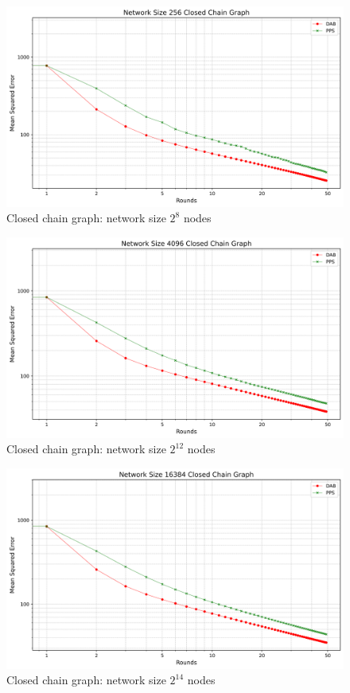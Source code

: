 \begin{figure}[H]
    \centering
    \includegraphics[scale=0.5]{figures/closedChainSimulations/DAB_vs_PPS_CCG_r50_n256.png}
    \caption{Closed chain graph: network size $2^{8}$ nodes}
    \label{fig:256ChainGraph}
\end{figure}

\begin{figure}[H]
    \centering
    \includegraphics[scale=0.5]{figures/closedChainSimulations/DAB_vs_PPS_CCG_r50_n4096.png}
    \caption{Closed chain graph: network size $2^{12}$ nodes}
    \label{fig:4096ChainGraph}
\end{figure}

\begin{figure}[H]
    \centering
    \includegraphics[scale=0.5]{figures/closedChainSimulations/DAB_vs_PPS_CCG_r50_n16384.png}
    \caption{Closed chain graph: network size $2^{14}$ nodes}
    \label{fig:16384ChainGraph}
\end{figure}

